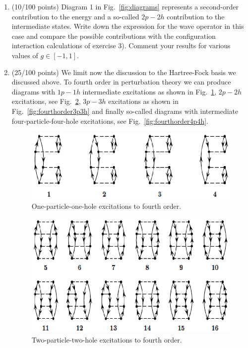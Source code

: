 \documentclass[prc]{revtex4} \usepackage[dvips]{graphicx}
\begin{document}
\begin{enumerate}
\item  (10/100 points) Diagram 1 in Fig.~\ref{fig:diagrams} represents a second-order contribution to the energy and a so-called $2p-2h$ contribution to the intermediate states. Write down the expression for the wave operator in this case and compare the possible contributions with the configuration interaction calculations of exercise 3). Comment your results for 
various values of $g\in [-1,1]$.  
\item  (25/100 points) We limit now the discussion to the Hartree-Fock basis  we discussed above. To fourth order in perturbation theory we can produce diagrams with $1p-1h$ intermediate excitations as shown in Fig.~\ref{fig:fourthorder1p1h}, $2p-2h$ excitations, see Fig.~\ref{fig:fourthorder2p2h}, $3p-3h$ excitations as shown in Fig.~\ref{fig:fourthorder3p3h} and finally so-called diagrams with intermediate four-particle-four-hole excitations, see Fig.~\ref{fig:fourthorder4p4h}. 
\begin{figure}[hbtp]
\includegraphics{figures/1p1h.ps}
\caption{One-particle-one-hole excitations to fourth order.}
\label{fig:fourthorder1p1h}
\end{figure}
\begin{figure}[hbtp]
\includegraphics{figures/2p2h.ps}
\caption{Two-particle-two-hole excitations to fourth order.}
\label{fig:fourthorder2p2h}
\end{figure}

\end{enumerate}
\end{document}

